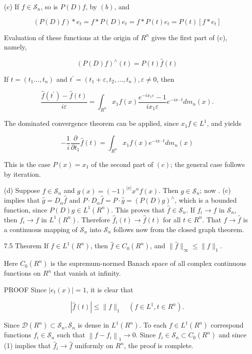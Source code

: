 \documentclass[10pt]{article}
\begin{document}
(c) If $f \in \mathscr{S}_{n}$, so is $P(D) f$, by $(b)$, and

$$
(P(D) f) * e_{t}=f * P(D) e_{t}=f * P(t) e_{t}=P(t)\left[f * e_{t}\right]
$$

Evaluation of these functions at the origin of $R^{n}$ gives the first part of (c), namely,

$$
(P(D) f)^{\wedge}(t)=P(t) \hat{f}(t)
$$

If $t=\left(t_{1} \ldots, t_{n}\right)$ and $t^{\prime}=\left(t_{1}+\varepsilon, t_{2}, \ldots, t_{n}\right), \varepsilon \neq 0$, then

$$
\frac{\hat{f}\left(t^{\prime}\right)-\hat{f}(t)}{i \varepsilon}=\int_{R^{n}} x_{1} f(x) \frac{e^{-i x_{1} \varepsilon}-1}{i x_{1} \varepsilon} e^{-i x \cdot t} d m_{n}(x) .
$$

The dominated convergence theorem can be applied, since $x_{1} f \in L^{1}$, and yields

$$
-\frac{1}{i} \frac{\partial}{\partial t_{1}} \hat{f}(t)=\int_{R^{n}} x_{1} f(x) e^{-i x \cdot t} d m_{n}(x)
$$

This is the case $P(x)=x_{1}$ of the second part of $(c)$; the general case follows by iteration.

(d) Suppose $f \in \mathscr{S}_{n}$ and $g(x)=(-1)^{|x|} x^{\alpha} f(x)$. Then $g \in \mathscr{S}_{n}$; now . (c) implies that $\hat{g}=D_{\alpha} \hat{f}$ and $P \cdot D_{\alpha} \hat{f}=P \cdot \hat{g}=(P(D) g)^{\wedge}$, which is a bounded function, since $P(D) g \in L^{1}\left(R^{n}\right)$. This proves that $\hat{f} \in \mathscr{S}_{n}$. If $f_{i} \rightarrow f$ in $\mathscr{S}_{n}$, then $f_{i} \rightarrow f$ in $L^{1}\left(R^{n}\right)$. Therefore $\hat{f}_{i}(t) \rightarrow \hat{f}(t)$ for all $t \in R^{n}$. That $f \rightarrow \hat{f}$ is a continuous mapping of $\mathscr{S}_{n}$ into $\mathscr{S}_{n}$ follows now from the closed graph theorem.

7.5 Theorem If $f \in L^{1}\left(R^{n}\right)$, then $\hat{f} \in C_{0}\left(R^{n}\right)$, and $\|\hat{f}\|_{\infty} \leq\|f\|_{1}$.

Here $C_{0}\left(R^{n}\right)$ is the supremum-normed Banach space of all complex continuous functions on $R^{n}$ that vanish at infinity.

PROOF Since $\left|e_{t}(x)\right|=1$, it is clear that

$$
|\hat{f}(t)| \leq\|f\|_{1} \quad\left(f \in L^{1}, t \in R^{n}\right) .
$$

Since $\mathscr{D}\left(R^{n}\right) \subset \mathscr{S}_{n}, \mathscr{S}_{n}$ is dense in $L^{1}\left(R^{n}\right)$. To each $f \in L^{1}\left(R^{n}\right)$ correspond functions $f_{i} \in \mathscr{S}_{n}$ such that $\left\|f-f_{i}\right\|_{1} \rightarrow 0$. Since $\hat{f}_{i} \in \mathscr{S}_{n} \subset C_{0}\left(R^{n}\right)$ and since (1) implies that $\hat{f}_{i} \rightarrow \hat{f}$ uniformly on $R^{n}$, the proof is complete.
\end{document}
